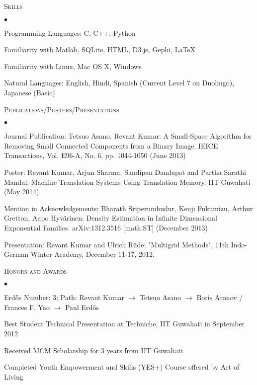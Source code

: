 \documentclass[10.5pt]{article}
\newcommand{\lineunder}{\\\vspace{-9pt}\hrulefill}
\newcommand{\header}[1]{{\normalsize\scshape{#1}} \lineunder}
\newenvironment{achievements}{\begin{list}{$\bullet$}{\topsep 0pt \itemsep 0pt}}{\end{list}}
\begin{document}
\vspace{4pt}

\header{Skills}
\begin{achievements}
\item Programming Languages: C, C++, Python
\item Familiarity with Matlab, SQLite, HTML, D3.js, Gephi, \LaTeX
\item Familiarity with Linux, Mac OS X, Windows
\item Natural Languages: English, Hindi, Spanish (Current Level 7 on Duolingo), Japanese (Basic)
\end{achievements}
	
\vspace{4pt}
	
\header{Publications/Posters/Presentations}
\begin{achievements}
\item Journal Publication: Tetsuo Asano, Revant Kumar: A Small-Space Algorithm for Removing Small Connected Components from a Binary Image. IEICE Transactions, Vol. E96-A, No. 6, pp. 1044-1050 (June 2013)
\item Poster: Revant Kumar, Arjun Sharma, Sandipan Dandapat and Partha Sarathi Mandal: Machine Translation Systems Using Translation Memory. IIT Guwahati (May 2014)
\item Mention in Acknowledgements: Bharath Sriperumbudur, Kenji Fukumizu, Arthur Gretton, Aapo Hyv\"{a}rinen: Density Estimation in Infinite Dimensional Exponential Families. arXiv:1312.3516 [math.ST] (December 2013)
\item Presentation: Revant Kumar and Ulrich R\"{u}de: "Multigrid Methods", 11th Indo-German Winter Academy, December 11-17, 2012.
\end{achievements} 

\vspace{4pt}

\header{Honors and Awards}
\begin{achievements}
\item Erd\H{o}s Number: 3; Path: Revant Kumar $\rightarrow$ Tetsuo Asano $\rightarrow$ Boris Aronov / Frances F. Yao $\rightarrow$ Paul Erd\H{o}s
\item Best Student Technical Presentation at Techniche, IIT Guwahati in September 2012
\item Received MCM Scholarship for 3 years from IIT Guwahati 
\item Completed Youth Empowerment and Skills (YES+) Course offered by Art of Living
\end{achievements}
\end{document}

